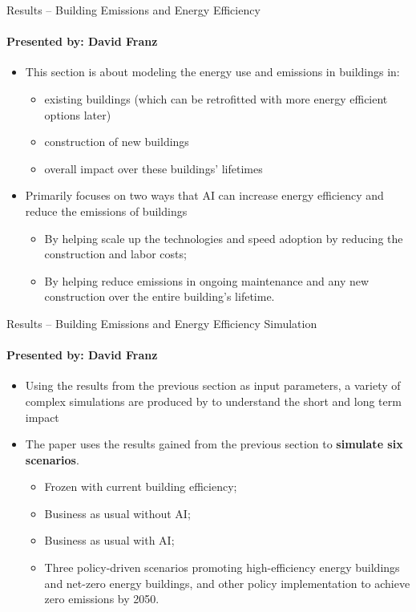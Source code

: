 \documentclass{beamer}
\begin{document}
\begin{frame}{Results – Building Emissions and Energy Efficiency}
\framesubtitle{Presented by: David Franz}

\begin{itemize}
    \item  This section is about modeling the energy use and emissions in buildings in:
    \begin{itemize}
        \item existing buildings (which can be retrofitted with more energy efficient options later)
        \item construction of new buildings
        \item  overall impact over these buildings' lifetimes
    \end{itemize}
    \item Primarily focuses on two ways that AI can increase energy efficiency and reduce the emissions of buildings
        \begin{itemize}
            \item By helping scale up the technologies and speed adoption by reducing the construction and labor costs;
            \item By helping reduce emissions in ongoing maintenance and any new construction over the entire building's lifetime.
        \end{itemize}
\end{itemize}
\end{frame}

\begin{frame}{Results – Building Emissions and Energy Efficiency Simulation}
\framesubtitle{Presented by: David Franz}
\begin{itemize}
    \item Using the results from the previous section as input parameters, a variety of complex simulations are produced by to understand the short and long term impact
    \item The paper uses the results gained from the previous section to \textbf{simulate six scenarios}. 
    \begin{itemize}
        \item Frozen with current building efficiency;
        \item Business as usual without AI;
        \item Business as usual with AI;
        \item Three policy-driven scenarios promoting high-efficiency energy buildings and net-zero energy buildings, and other policy implementation to achieve zero emissions by 2050.
    \end{itemize}
\end{itemize}
\end{frame}
\end{document}
